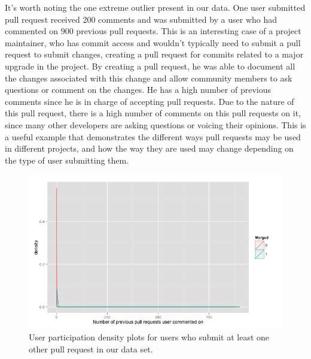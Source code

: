 \documentclass{sigchi}
\begin{document}
It's worth noting the one extreme outlier present in our data. One user
submitted pull request received 200 comments and was submitted by a user who had
commented on 900 previous pull requests. This is an interesting case of a
project maintainer, who has commit access and wouldn't typically need to submit
a pull request to submit changes, creating a pull request for commits related to
a major upgrade in the project. By creating a pull request, he was able to
document all the changes associated with this change and allow community members
to ask questions or comment on the changes. He has a high number of previous
comments since he is in charge of accepting pull requests. Due to the nature of
this pull request, there is a high number of comments on this pull requests on
it, since many other developers are asking questions or voicing their opinions.
This is a useful example that demonstrates the different ways pull requests may
be used in different projects, and how the way they are used may change
depending on the type of user submitting them.

\begin{figure}[p] \centering
\includegraphics[scale=0.6]{figures/number_comments_density_repeaters_ggplot.png}
\caption{User participation density plots for users who submit at least one
other pull request in our data set.} \label{fig:repeaters} \end{figure}
\end{document}
